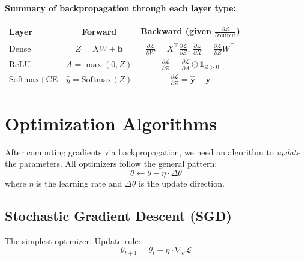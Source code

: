 \documentclass[12pt, a4paper]{report}
\theoremstyle{definition}
\begin{document}
\begin{keyidea}
\textbf{Summary of backpropagation through each layer type:}

\begin{center}
\renewcommand{\arraystretch}{1.5}
\begin{tabular}{lcc}
\toprule
\textbf{Layer} & \textbf{Forward} & \textbf{Backward (given $\frac{\partial \mathcal{L}}{\partial \text{output}}$)} \\
\midrule
Dense & $Z = XW + \mathbf{b}$ & $\frac{\partial \mathcal{L}}{\partial W} = X^\top \frac{\partial \mathcal{L}}{\partial Z}$, \; $\frac{\partial \mathcal{L}}{\partial X} = \frac{\partial \mathcal{L}}{\partial Z} W^\top$ \\
ReLU & $A = \max(0, Z)$ & $\frac{\partial \mathcal{L}}{\partial Z} = \frac{\partial \mathcal{L}}{\partial A} \odot \mathbb{1}_{Z > 0}$ \\
Softmax+CE & $\hat{y} = \text{Softmax}(Z)$ & $\frac{\partial \mathcal{L}}{\partial Z} = \hat{\mathbf{y}} - \mathbf{y}$ \\
\bottomrule
\end{tabular}
\end{center}
\end{keyidea}


\chapter{Optimization Algorithms}

After computing gradients via backpropagation, we need an algorithm to \textit{update} the parameters. All optimizers follow the general pattern:
\begin{equation}
    \theta \leftarrow \theta - \eta \cdot \Delta\theta
\end{equation}
where $\eta$ is the learning rate and $\Delta\theta$ is the update direction.

\section{Stochastic Gradient Descent (SGD)}

The simplest optimizer. Update rule:
\begin{equation}
    \theta_{t+1} = \theta_t - \eta \cdot \nabla_\theta \mathcal{L}
\end{equation}
\end{document}
